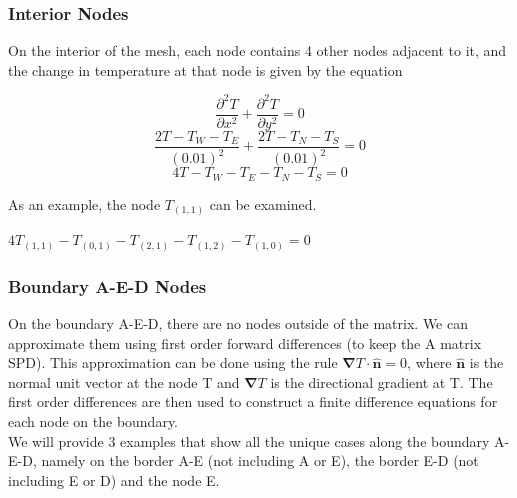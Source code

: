 \documentclass[12pt,a4paper]{article}
\begin{document}
\subsubsection{Interior Nodes}
On the interior of the mesh, each node contains 4 other nodes adjacent to it, and the change in temperature at that node is given by the equation
\begin{center}
\[\frac{\partial^2 T}{\partial x^2}+\frac{\partial^2 T}{\partial y^2}=0\]
\[\frac{2T-T_W-T_E}{(0.01)^2}+\frac{2T-T_N-T_S}{(0.01)^2}=0\]
\[4T-T_W-T_E-T_N-T_S=0\]
\end{center}
\begin{center}
\end{center}
As an example, the node $T_{(1,1)}$ can be examined.
\begin{center}
  $4T_{(1,1)}-T_{(0,1)}-T_{(2,1)}-T_{(1,2)}-T_{(1,0)}=0$
\end{center}
\subsubsection*{Boundary A-E-D Nodes}
On the boundary A-E-D, there are no nodes outside of the matrix. We can approximate them using first order forward differences (to keep the A matrix SPD). This approximation can be done using the rule $\boldsymbol{\nabla} T \cdot {\hat{\textbf{n}}} = 0$, where ${\hat{\textbf{n}}}$ is the normal unit vector at the node T and $\boldsymbol{\nabla} T$ is the directional gradient at T. The first order differences are then used to construct a finite difference equations for each node on the boundary.\\We will provide 3 examples that show all the unique cases along the boundary A-E-D, namely on the border A-E (not including A or E), the border E-D (not including E or D) and the node E.
\end{document}
